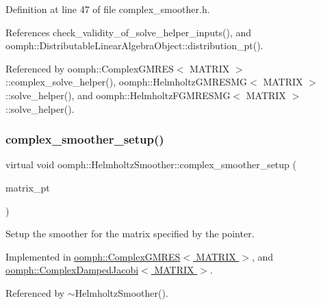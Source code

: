 Definition at line 47 of file complex\+\_\+smoother.\+h.



References check\+\_\+validity\+\_\+of\+\_\+solve\+\_\+helper\+\_\+inputs(), and oomph\+::\+Distributable\+Linear\+Algebra\+Object\+::distribution\+\_\+pt().



Referenced by oomph\+::\+Complex\+G\+M\+R\+E\+S$<$ M\+A\+T\+R\+I\+X $>$\+::complex\+\_\+solve\+\_\+helper(), oomph\+::\+Helmholtz\+G\+M\+R\+E\+S\+M\+G$<$ M\+A\+T\+R\+I\+X $>$\+::solve\+\_\+helper(), and oomph\+::\+Helmholtz\+F\+G\+M\+R\+E\+S\+M\+G$<$ M\+A\+T\+R\+I\+X $>$\+::solve\+\_\+helper().

\mbox{\label{classoomph_1_1HelmholtzSmoother_a7fffc8d9a93fa5ca0a3e21c972ea3c05}} 
\subsubsection{\texorpdfstring{complex\+\_\+smoother\+\_\+setup()}{complex\_smoother\_setup()}}
{\footnotesize\ttfamily virtual void oomph\+::\+Helmholtz\+Smoother\+::complex\+\_\+smoother\+\_\+setup (\begin{DoxyParamCaption}\item[{\hyperlink{classoomph_1_1Vector}{Vector}$<$ \hyperlink{classoomph_1_1CRDoubleMatrix}{C\+R\+Double\+Matrix} $\ast$$>$}]{matrix\+\_\+pt }\end{DoxyParamCaption})\hspace{0.3cm}{\ttfamily [pure virtual]}}



Setup the smoother for the matrix specified by the pointer. 



Implemented in \hyperlink{classoomph_1_1ComplexGMRES_a391b81dac92362f07b2cf80f3ba0821a}{oomph\+::\+Complex\+G\+M\+R\+E\+S$<$ M\+A\+T\+R\+I\+X $>$}, and \hyperlink{classoomph_1_1ComplexDampedJacobi_a9a322c00b8e352ad37db87a23a1ec6e3}{oomph\+::\+Complex\+Damped\+Jacobi$<$ M\+A\+T\+R\+I\+X $>$}.



Referenced by $\sim$\+Helmholtz\+Smoother().


